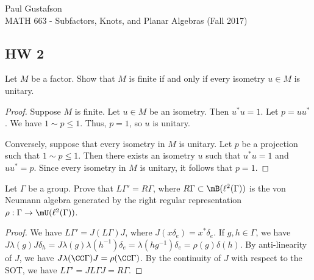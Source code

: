 \documentclass{article}
\begin{document}
\noindent Paul Gustafson\\
\noindent MATH 663 - Subfactors, Knots, and Planar Algebras (Fall 2017)

\subsection*{HW 2}
 Let $M$ be a factor. Show that $M$ is finite if and only if every isometry $u \in M$ is unitary.
\begin{proof}
  Suppose $M$ is finite.  Let $u \in M$ be an isometry.  Then $u^* u = 1$.  Let $p = u u^*$.  We have
  $1 \sim p \le 1$.  Thus, $p = 1$, so $u$ is unitary.

  Conversely, suppose that every isometry in $M$ is unitary.  Let $p$ be a projection such that $1 \sim p \le 1$.
  Then there exists an isometry $u$ such that $u^* u = 1$ and $u u^* = p$. Since every isometry in $M$ is unitary,
  it follows that $p = 1$.
\end{proof}

 Let $\Gamma$ be a group. Prove that $L \Gamma' = R \Gamma$, where $R \Gamma \subset \mB(\ell^2(\Gamma))$ is
the von Neumann algebra generated by the right regular representation $\rho: \Gamma \to \mU(\ell^2(\Gamma))$.
\begin{proof}
  We have $L \Gamma' = J (L \Gamma) J$, where $J(x \delta_e) = x^* \delta_e$.  If $g, h \in \Gamma$, we have
  $J \lambda(g) J \delta_h = J \lambda(g) \lambda(h^{-1}) \delta_e = \lambda(h g^{-1}) \delta_e = \rho(g) \delta(h)$.
  By anti-linearity of $J$, we have $J \lambda(\CC \Gamma) J = \rho(\CC \Gamma)$.  By the continuity of $J$
  with respect to the SOT, we have $L \Gamma' = J L \Gamma J = R \Gamma$.
\end{proof}
\end{document}
